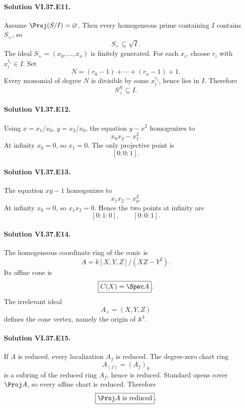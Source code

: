 \paragraph{Solution VI.37.E11.}
Assume \(\Proj(S/I)=\varnothing\). Then every homogeneous prime containing \(I\) contains \(S_+\), so
\[
S_+\subseteq\sqrt I.
\]
The ideal \(S_+=(x_0,\ldots,x_n)\) is finitely generated. For each \(x_i\), choose \(r_i\) with \(x_i^{r_i}\in I\). Set
\[
N=(r_0-1)+\cdots+(r_n-1)+1.
\]
Every monomial of degree \(N\) is divisible by some \(x_i^{r_i}\), hence lies in \(I\). Therefore
\[
\boxed{S_+^N\subseteq I}.
\]

\paragraph{Solution VI.37.E12.}
Using \(x=x_1/x_0\), \(y=x_2/x_0\), the equation \(y-x^2\) homogenizes to
\[
\boxed{x_0x_2-x_1^2}.
\]
At infinity \(x_0=0\), so \(x_1=0\). The only projective point is
\[
\boxed{[0:0:1]}.
\]

\paragraph{Solution VI.37.E13.}
The equation \(xy-1\) homogenizes to
\[
\boxed{x_1x_2-x_0^2}.
\]
At infinity \(x_0=0\), so \(x_1x_2=0\). Hence the two points at infinity are
\[
\boxed{[0:1:0],\qquad[0:0:1]}.
\]

\paragraph{Solution VI.37.E14.}
The homogeneous coordinate ring of the conic is
\[
A=k[X,Y,Z]/(XZ-Y^2).
\]
Its affine cone is
\[
\boxed{C(X)=\Spec A}.
\]
The irrelevant ideal
\[
A_+=(X,Y,Z)
\]
defines the cone vertex, namely the origin of \(\mathbb A^3\).

\paragraph{Solution VI.37.E15.}
If \(A\) is reduced, every localization \(A_f\) is reduced. The degree-zero chart ring
\[
A_{(f)}=(A_f)_0
\]
is a subring of the reduced ring \(A_f\), hence is reduced. Standard opens cover \(\Proj A\), so every affine chart is reduced. Therefore
\[
\boxed{\Proj A\text{ is reduced}}.
\]

